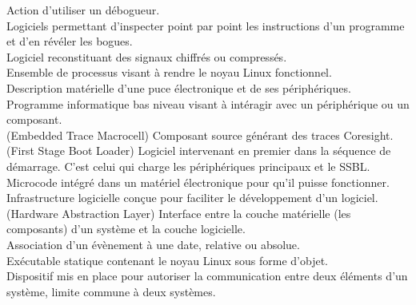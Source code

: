 \noindent
{} Action d'utiliser un débogueur. \\

\noindent
{} Logiciels permettant d'inspecter point par point les
instructions d'un programme et d'en révéler les bogues. \\

\noindent
{} Logiciel reconstituant des signaux chiffrés ou compressés. \\

\noindent
{} Ensemble de processus visant à rendre le noyau Linux
fonctionnel. \\

\noindent
{} Description matérielle d'une puce électronique et de ses
périphériques. \\

\noindent
{} Programme informatique bas niveau visant à intéragir avec un
périphérique ou un composant. \\

\noindent
{} (Embedded Trace Macrocell) Composant source générant des traces
Coresight. \\

\noindent
{} (First Stage Boot Loader) Logiciel intervenant en premier dans la
séquence de démarrage. C'est celui qui charge les périphériques principaux et
le SSBL. \\

\noindent
{} Microcode intégré dans un matériel électronique pour qu'il
puisse fonctionner. \\

\noindent
{} Infrastructure logicielle conçue pour faciliter le
développement d'un logiciel. \\

\noindent
{} (Hardware Abstraction Layer) Interface entre la couche matérielle
(les composants) d'un système et la couche logicielle. \\

\noindent
{} Association d'un évènement à une date, relative ou absolue.
\\

\noindent
{} Exécutable statique contenant le noyau Linux sous forme d'objet.
\\

\noindent
{} Dispositif mis en place pour autoriser la communication
entre deux éléments d'un système, limite commune à deux systèmes. \\

